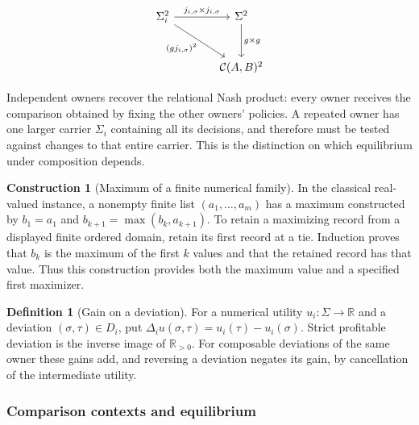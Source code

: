 \documentclass[11pt,a4paper]{article}
\numberwithin{equation}{section}
\theoremstyle{definition}
\newtheorem{definition}[theorem]{Definition}
\newtheorem{construction}[construction]{Construction}
\theoremstyle{remark}
\theoremstyle{plain}
\begin{document}
\[
\begin{tikzcd}[column sep=large,row sep=large]
 \Sigma_i^2 \arrow[r,"j_{i,\sigma}\times j_{i,\sigma}"]
   \arrow[dr,"{(gj_{i,\sigma})^2}"'] &
 \Sigma^2 \arrow[d,"g\times g"]\\
 &\mathcal C(A,B)^2
\end{tikzcd}
\]

Independent owners recover the relational Nash product: every owner
receives the comparison obtained by fixing the other owners' policies.
A repeated owner has one larger carrier $\Sigma_i$ containing all its
decisions, and therefore must be tested against changes to that entire
carrier. This is the distinction on which equilibrium under composition
depends.

\begin{construction}[Maximum of a finite numerical family]
\label{con:egt-finite-max}
In the classical real-valued instance, a nonempty finite list
$(a_1,\ldots,a_m)$ has a maximum constructed by
$b_1=a_1$ and $b_{k+1}=\max(b_k,a_{k+1})$. To retain a maximizing
record from a displayed finite ordered domain, retain its first record
at a tie. Induction proves that $b_k$ is the maximum of the first $k$
values and that the retained record has that value. Thus this construction
provides both the maximum value and a specified first maximizer.
\end{construction}

\begin{definition}[Gain on a deviation]
\label{def:egt-deviation-gain}
For a numerical utility $u_i:\Sigma\to\mathbb R$ and a deviation
$(\sigma,\tau)\in D_i$, put
$\Delta_i u(\sigma,\tau)=u_i(\tau)-u_i(\sigma)$.
Strict profitable deviation is the inverse image of $\mathbb R_{>0}$.
For composable deviations of the same owner these gains add, and reversing
a deviation negates its gain, by cancellation of the intermediate utility.
\end{definition}

\subsubsection{Comparison contexts and equilibrium}
\end{document}
